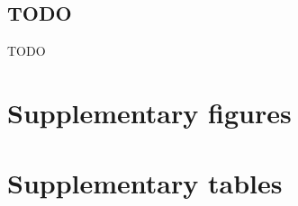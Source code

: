\documentclass[a4paper,11pt,abstracton,hidelinks]{scrartcl}
\newcommand{\beginsupplement}{%
  \setcounter{table}{0}
  \renewcommand{\thetable}{S\arabic{table}}%
  \setcounter{figure}{0}
  \renewcommand{\thefigure}{S\arabic{figure}}%
}
\begin{document}
\subsection*{TODO}

TODO


\printbibliography


\beginsupplement


\section*{Supplementary figures}

\clearpage


\section*{Supplementary tables}

\clearpage
\end{document}
